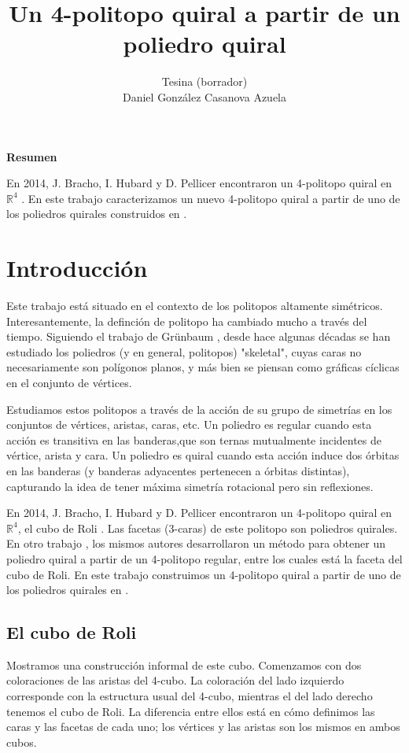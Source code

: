 \documentclass[spanish]{article}
\title{Un 4-politopo quiral a partir de un poliedro quiral}
\author{Tesina (borrador)\\Daniel González Casanova Azuela}
\date{}
\theoremstyle{definition}
\newcommand{\R}{\mathbb{R}}
\begin{document}
\maketitle
\begin{center}
	\large{\textbf{Resumen}}
\end{center}
En 2014, J. Bracho, I. Hubard y D. Pellicer encontraron un 4-politopo quiral en $\R^4$  \cite{bracho2013finite}. En este trabajo caracterizamos un nuevo 4-politopo quiral a partir de uno de los poliedros quirales construidos en \cite{bracho2021chiral}.

\tableofcontents

\section{Introducción}
Este trabajo está situado en el contexto de los politopos altamente simétricos. Interesantemente, la definción de politopo ha cambiado mucho a través del tiempo. Siguiendo el trabajo de Grünbaum \cite{grunbaum1977regular}, desde hace algunas décadas se han estudiado los poliedros (y en general, politopos) "skeletal", cuyas caras no necesariamente son polígonos planos, y más bien se piensan como gráficas cíclicas en el conjunto de vértices.

Estudiamos estos politopos a través de la acción de su grupo de simetrías en los conjuntos de vértices, aristas, caras, etc. Un poliedro es regular cuando esta acción es transitiva en las banderas,que son ternas mutualmente incidentes de vértice, arista y cara. Un poliedro es quiral cuando esta acción induce dos órbitas en las banderas (y banderas adyacentes pertenecen a órbitas distintas), capturando la idea de tener máxima simetría rotacional pero sin reflexiones.

En 2014, J. Bracho, I. Hubard y D. Pellicer encontraron un 4-politopo quiral en $\R^4$, el cubo de Roli \cite{bracho2013chiral}. Las facetas (3-caras) de este politopo son poliedros quirales. En otro trabajo \cite{bracho2021finite}, los mismos autores desarrollaron un método para obtener un poliedro quiral a partir de un 4-politopo regular, entre los cuales está la faceta del cubo de Roli. En este trabajo construimos un 4-politopo quiral a partir de uno de los poliedros quirales en \cite{bracho2013chiral}.

\subsection{El cubo de Roli}
Mostramos una construcción informal de este cubo. Comenzamos con dos coloraciones de las aristas del 4-cubo. La coloración del lado izquierdo corresponde con la estructura usual del 4-cubo, mientras el del lado derecho tenemos el cubo de Roli. La diferencia entre ellos está en cómo definimos las caras y las facetas de cada uno; los vértices y las aristas son los mismos en ambos cubos. 
\end{document}
